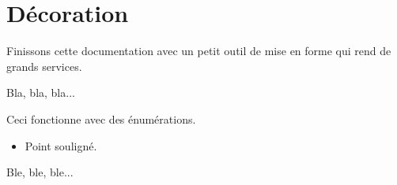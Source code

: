\documentclass{tutodoc}
\begin{document}
\section{Décoration}

Finissons cette documentation avec un petit outil de mise en forme qui rend de grands services.


\begin{tdoclatex}
Bla, bla, bla...

\tdocsep %

Ceci fonctionne avec des énumérations.

\begin{itemize}
    \item Point souligné.
\end{itemize}

\tdocsep %

Ble, ble, ble...
\end{tdoclatex}
\end{document}
